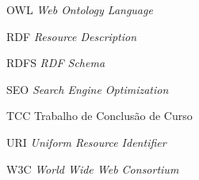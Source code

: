 \begin{siglas}
  \item[OWL] \textit{Web Ontology Language}
  \item[RDF] \textit{Resource Description}
  \item[RDFS] \textit{RDF Schema}
\item[SEO] \textit{Search Engine Optimization}
\item[TCC] Trabalho de Conclusão de Curso
\item[URI] \textit{Uniform Resource Identifier}
  \item[W3C] \textit{World Wide Web Consortium}
\end{siglas}
